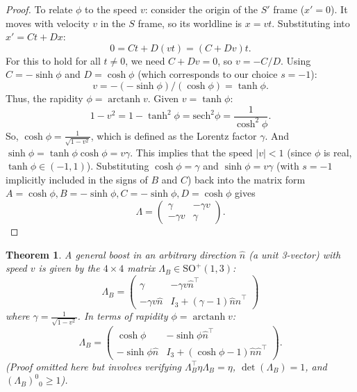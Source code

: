 \documentclass{amsart}
\newtheorem{theorem}{Theorem}[section]
\theoremstyle{definition}
\theoremstyle{remark}
\DeclareMathOperator{\arctanh}{arctanh}
\begin{document}
\begin{proof}
  To relate $\phi$ to the speed $v$: consider the origin of the $S'$ frame ($x'=0$). It moves with velocity $v$ in the $S$ frame, so its worldline is $x=vt$.
  Substituting into $x' = C t + D x$:
  \[ 0 = C t + D (vt) = (C + Dv)t. \]
  For this to hold for all $t \neq 0$, we need $C+Dv=0$, so $v = -C/D$.
  Using $C = -\sinh\phi$ and $D = \cosh\phi$ (which corresponds to our choice $s=-1$):
  \[ v = -(-\sinh\phi) / (\cosh\phi) = \tanh\phi. \]
  Thus, the rapidity $\phi = \arctanh v$.
  Given $v = \tanh\phi$:
  \[ 1 - v^2 = 1 - \tanh^2\phi = \mathrm{sech}^2\phi = \frac{1}{\cosh^2\phi}. \]
  So, $\cosh\phi = \frac{1}{\sqrt{1-v^2}}$, which is defined as the Lorentz factor $\gamma$.
  And $\sinh\phi = \tanh\phi \cosh\phi = v\gamma$.
  This implies that the speed $|v| < 1$ (since $\phi$ is real, $\tanh\phi \in (-1,1)$).
  Substituting $\cosh\phi = \gamma$ and $\sinh\phi = v\gamma$ (with $s=-1$ implicitly included in the signs of $B$ and $C$) back into the matrix form $A=\cosh\phi, B=-\sinh\phi, C=-\sinh\phi, D=\cosh\phi$ gives
  \begin{equation*}
  \Lambda =
  \begin{pmatrix}
    \gamma & -\gamma v \\
    -\gamma v & \gamma
  \end{pmatrix}.
  \end{equation*}
\end{proof}

\begin{theorem}\label{thm:general_boost_so13}
  A general boost in an arbitrary direction $\hat{n}$ (a unit 3-vector) with speed $v$ is given by the $4 \times 4$ matrix $\Lambda_B \in \mathrm{SO}^+(1,3)$:
  \begin{equation*}
  \Lambda_B =
  \begin{pmatrix}
    \gamma & -\gamma v \hat{n}^\top \\
    -\gamma v \hat{n} & I_3 + \left(\gamma-1\right)\hat{n}\hat{n}^\top
  \end{pmatrix}
  \end{equation*}
  where $\gamma=\frac{1}{\sqrt{1-v^2}}$. In terms of rapidity $\phi=\arctanh v$:
  \begin{equation*}
  \Lambda_B =
  \begin{pmatrix}
    \cosh \phi & -\sinh \phi \hat{n}^\top \\
    -\sinh \phi \hat{n} & I_3 + (\cosh \phi - 1) \hat{n} \hat{n}^\top
  \end{pmatrix}.
  \end{equation*}
  (Proof omitted here but involves verifying $\Lambda_B^\top \eta \Lambda_B = \eta$, $\det(\Lambda_B)=1$, and $(\Lambda_B)^0{}_0 \ge 1$).
\end{theorem}
\end{document}
